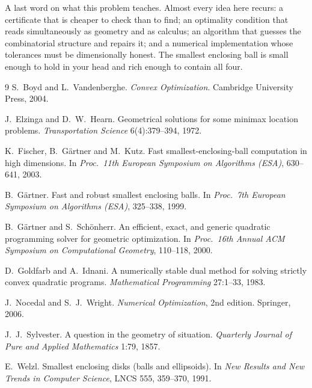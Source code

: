\documentclass[11pt,a4paper]{article}
\theoremstyle{plain}
\theoremstyle{definition}
\theoremstyle{remark}
\begin{document}
A last word on what this problem teaches. Almost every idea here recurs: a
certificate that is cheaper to check than to find; an optimality condition that
reads simultaneously as geometry and as calculus; an algorithm that guesses the
combinatorial structure and repairs it; and a numerical implementation whose
tolerances must be dimensionally honest. The smallest enclosing ball is small
enough to hold in your head and rich enough to contain all four.

\begin{thebibliography}{9}
  S.~Boyd and L.~Vandenberghe.
  \emph{Convex Optimization}.
  Cambridge University Press, 2004.

  J.~Elzinga and D.~W.~Hearn.
  Geometrical solutions for some minimax location problems.
  \emph{Transportation Science} 6(4):379--394, 1972.

  K.~Fischer, B.~G\"artner and M.~Kutz.
  Fast smallest-enclosing-ball computation in high dimensions.
  In \emph{Proc.\ 11th European Symposium on Algorithms (ESA)}, 630--641, 2003.

  B.~G\"artner.
  Fast and robust smallest enclosing balls.
  In \emph{Proc.\ 7th European Symposium on Algorithms (ESA)}, 325--338, 1999.

  B.~G\"artner and S.~Sch\"onherr.
  An efficient, exact, and generic quadratic programming solver for geometric
  optimization.
  In \emph{Proc.\ 16th Annual ACM Symposium on Computational Geometry},
  110--118, 2000.

  D.~Goldfarb and A.~Idnani.
  A numerically stable dual method for solving strictly convex quadratic programs.
  \emph{Mathematical Programming} 27:1--33, 1983.

  J.~Nocedal and S.~J.~Wright.
  \emph{Numerical Optimization}, 2nd edition.
  Springer, 2006.

  J.~J.~Sylvester.
  A question in the geometry of situation.
  \emph{Quarterly Journal of Pure and Applied Mathematics} 1:79, 1857.

  E.~Welzl.
  Smallest enclosing disks (balls and ellipsoids).
  In \emph{New Results and New Trends in Computer Science}, LNCS 555, 359--370, 1991.
\end{thebibliography}
\end{document}
